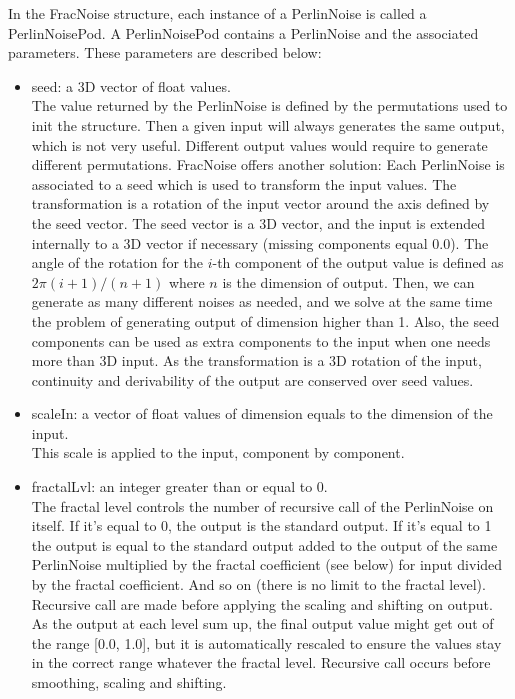 In the FracNoise structure, each instance of a PerlinNoise is called a PerlinNoisePod. A PerlinNoisePod contains a PerlinNoise and the associated parameters. These parameters are described below:\\
\begin{itemize}
\item seed: a 3D vector of float values.\\
The value returned by the PerlinNoise is defined by the permutations used to init the structure. Then a given input will always generates the same output, which is not very useful. Different output values would require to generate different permutations. FracNoise offers another solution: Each PerlinNoise is associated to a seed which is used to transform the input values. The transformation is a rotation of the input vector around the axis defined by the seed vector. The seed vector is a 3D vector, and the input is extended internally to a 3D vector if necessary (missing components equal 0.0). The angle of the rotation for the $i$-th component of the output value is defined as $2\pi(i+1)/(n+1)$ where $n$ is the dimension of output. Then, we can generate as many different noises as needed, and we solve at the same time the problem of generating output of dimension higher than 1. Also, the seed components can be used as extra components to the input when one needs more than 3D input. As the transformation is a 3D rotation of the input, continuity and derivability of the output are conserved over seed values.
\item scaleIn: a vector of float values of dimension equals to the dimension of the input.\\
This scale is applied to the input, component by component.
\item fractalLvl: an integer greater than or equal to 0.\\
The fractal level controls the number of recursive call of the PerlinNoise on itself. If it's equal to 0, the output is the standard output. If it's equal to 1 the output is equal to the standard output added to the output of the same PerlinNoise multiplied by the fractal coefficient (see below) for input divided by the fractal coefficient. And so on (there is no limit to the fractal level). Recursive call are made before applying the scaling and shifting on output. As the output at each level sum up, the final output value might get out of the range [0.0, 1.0], but it is automatically rescaled to ensure the values stay in the correct range whatever the fractal level. Recursive call occurs before smoothing, scaling and shifting.

\end{itemize}
